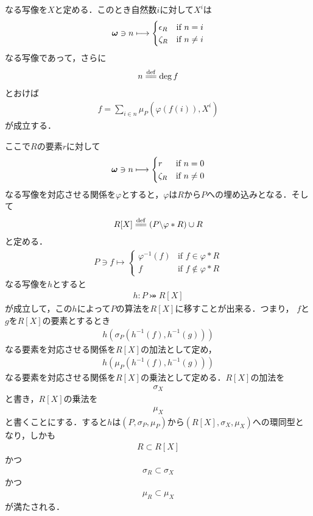 	なる写像を$X$と定める．このとき自然数$i$に対して$X^i$は
	\begin{align}
		{\boldsymbol \omega} \ni n \longmapsto
		\begin{cases}
			\epsilon_R & \mbox{if } n = i \\
			\zeta_R & \mbox{if } n \neq i
		\end{cases}
	\end{align}
	なる写像であって，さらに
	\begin{align}
		n \defeq \deg{f}
	\end{align}
	とおけば
	\begin{align}
		f = \sum_{i \in n} \mu_P \left(\varphi(f(i)),X^i\right)
	\end{align}
	が成立する．
	
	ここで$R$の要素$r$に対して
	\begin{align}
		{\boldsymbol \omega} \ni n \longmapsto
		\begin{cases}
			r & \mbox{if } n = 0 \\
			\zeta_R & \mbox{if } n \neq 0
		\end{cases}
	\end{align}
	なる写像を対応させる関係を$\varphi$とすると，$\varphi$は$R$から$P$への埋め込みとなる．そして
	\begin{align}
		R[X] \defeq \left(P \backslash \varphi \ast R\right) \cup R
	\end{align}
	と定める．
	\begin{align}
		P \ni f \longmapsto
		\begin{cases}
			\varphi^{-1}(f) & \mbox{if } f \in \varphi \ast R \\
			f & \mbox{if } f \notin \varphi \ast R
		\end{cases}
	\end{align}
	なる写像を$h$とすると
	\begin{align}
		h:P \bij R[X]
	\end{align}
	が成立して，この$h$によって$P$の算法を$R[X]$に移すことが出来る．つまり，
	$f$と$g$を$R[X]$の要素とするとき
	\begin{align}
		h\left( \sigma_P\left(h^{-1}(f),h^{-1}(g)\right) \right)
	\end{align}
	なる要素を対応させる関係を$R[X]$の加法として定め，
	\begin{align}
		h\left( \mu_P\left(h^{-1}(f),h^{-1}(g)\right) \right)
	\end{align}
	なる要素を対応させる関係を$R[X]$の乗法として定める．$R[X]$の加法を
	\begin{align}
		\sigma_X
	\end{align}
	と書き，$R[X]$の乗法を
	\begin{align}
		\mu_X
	\end{align}
	と書くことにする．すると$h$は$(P,\sigma_P,\mu_P)$から$(R[X],\sigma_X,\mu_X)$への環同型となり，しかも
	\begin{align}
		R \subset R[X]
	\end{align}
	かつ
	\begin{align}
		\sigma_R \subset \sigma_X
	\end{align}
	かつ
	\begin{align}
		\mu_R \subset \mu_X
	\end{align}
	が満たされる．
	
